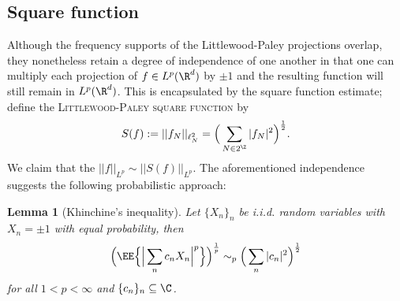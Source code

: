 \documentclass[reqno]{amsart}
\newtheorem{lemma}[theorem]{Lemma}
\theoremstyle{definition}
\theoremstyle{remark}
\renewcommand{\emph}{\textsc}
\begin{document}
\subsection{Square function}
Although the frequency supports of the Littlewood-Paley projections overlap, they nonetheless retain a degree of independence of one another in that one can multiply each projection of $f \in L^p (\R^d)$ by $\pm 1$ and the resulting function will still remain in $L^p (\R^d)$. This is encapsulated by the square function estimate; define the \emph{Littlewood-Paley square function} by
	\[ S(f) := ||f_N||_{\ell^2_N} = \Big( \sum_{N \in 2^\Z} |f_N|^2 \Big)^\frac12. \]	 
We claim that the $||f||_{L^p} \sim ||S(f)||_{L^p}$. The aforementioned independence suggests the following probabilistic approach:	

\begin{lemma}[Khinchine's inequality]
	Let $\{ X_n \}_n$ be i.i.d. random variables with $X_n = \pm 1$ with equal probability, then 
		\[ \Big( \EE \Big\{ \Big| \sum_n c_n X_n \Big|^p \Big\}  \Big)^\frac1p \sim_p \Big( \sum_n |c_n|^2\Big)^\frac12 \]
	for all $1 < p < \infty$ and $\{c_n\}_n \subseteq \C$. 	
\end{lemma}
\end{document}
